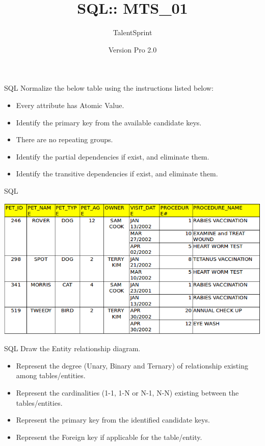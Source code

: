 \documentclass[14pt]{beamer}
\title[BPT:VCS:01]{SQL:: MTS\_01}
\author[TS]{TalentSprint}
\institute[L\&D]{Licensed To Skill}
\date{Version Pro 2.0}
\begin{document}
\begin{frame}
  \titlepage
\end{frame}

\begin{frame}{SQL}
Normalize the below table using the instructions listed below:
 \begin{itemize}
  \item Every attribute has Atomic Value.
  \item Identify the primary key from the available candidate keys.
  \item There are no repeating groups.
  \item Identify the partial dependencies if exist, and eliminate them.
  \item Identify the transitive dependencies if exist, and eliminate them.
 \end{itemize}
\end{frame}

\begin{frame}{SQL}
\begin{center}
    \includegraphics[scale=0.4]{Sql_Image.png}
  \end{center}
\end{frame}

\begin{frame}{SQL}
Draw the Entity relationship diagram.
 \begin{itemize}
  \item Represent the degree (Unary, Binary and Ternary) of relationship existing among tables/entities.
  \item Represent the cardinalities (1-1, 1-N or N-1, N-N) existing between the tables/entities.
  \item Represent the primary key from the identified candidate keys.
  \item Represent the Foreign key if applicable for the table/entity.
 \end{itemize}
\end{frame}
\end{document}
